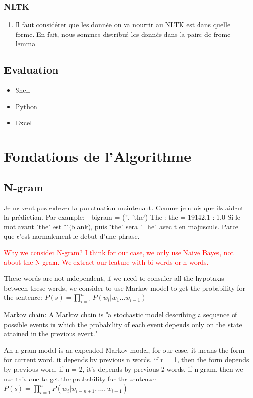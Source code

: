 \documentclass[a4paper]{article}
\begin{document}
\subsubsection{NLTK}
\begin{enumerate}
\item Il faut considérer que les donnée on va nourrir au NLTK est dans quelle forme. En fait, nous sommes distribué les donnés dans la paire de frome-lemma.
\end{enumerate}

\subsection{Evaluation}
\begin{itemize}
\item Shell
\item Python
\item Excel
\end{itemize}

\section{Fondations de l’Algorithme}
\subsection{N-gram}
Je ne veut pas enlever la ponctuation maintenant. Comme je crois que ils aident la prédiction.  Par example:
- bigram = ('', 'the')       The : the    =  19142.1 : 1.0
Si le mot avant "the" est ""(blank), puis "the" sera "The" avec t en majuscule. Parce que c'est normalement le debut d'une phrase.

\textcolor{red}{Why we consider N-gram? I think for our case, we only use Naive Bayes, not about the N-gram. We extract our feature with bi-words or n-words.}

These words are not independent, if we need to consider all the hypotaxis between these words, we consider to use Markov model to get the probability for the sentence: $P(s)=\prod\limits_{i=1}^{n}P(w_i|w_1...w_{i-1})$

\href{https://en.wikipedia.org/wiki/Markov_chain}{Markov chain}: A Markov chain is "a stochastic model describing a sequence of possible events in which the probability of each event depends only on the state attained in the previous event."

An n-gram model is an expended Markov model, for our case, it means the form for current word, it depends by previous n words. if n = 1, then the form depends by previous word, if n = 2, it's depends by previous 2 words, if n-gram, then we use this one to get the probability for the sentense: $P(s)=\prod\limits_{i=1}^{n}P(w_i|w_{i-n+1},...,w_{i-1})$
\end{document}
